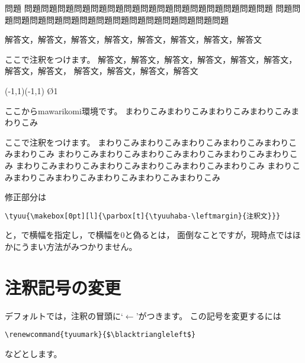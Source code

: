 \documentclass[a4j,fleqn]{jarticle}
\begin{document}
\begin{itembox}{問題}
問題問題問題問題問題問題問題問題問題問題問題問題問題問題問題
問題問題問題問題問題問題問題問題問題問題問題問題問題問題問題
\end{itembox}
\begin{tyuukai}
解答文，解答文，解答文，解答文，解答文，解答文，解答文，解答文

ここで注釈をつけます。
解答文，解答文，解答文，解答文，解答文，解答文，解答文，解答文，
解答文，解答文，解答文，解答文

\begin{mawarikomi}{}{%
  \begin{zahyou*}[ul=1cm](-1,1)(-1,1)
    \Drawline{\LT\LB\RB\RT\LT}
    \En\O1
  \end{zahyou*}}
ここから\textsf{mawarikomi}環境です。
まわりこみまわりこみまわりこみまわりこみまわりこみ

ここで注釈をつけます。
まわりこみまわりこみまわりこみまわりこみまわりこみまわりこみ
まわりこみまわりこみまわりこみまわりこみまわりこみまわりこみ
まわりこみまわりこみまわりこみまわりこみまわりこみまわりこみ
まわりこみまわりこみまわりこみまわりこみまわりこみまわりこみ
\end{mawarikomi}
\end{tyuukai}
修正部分は
\begin{jquote}
\begin{verbatim}
\tyuu{\makebox[0pt][l]{\parbox[t]{\tyuuhaba-\leftmargin}{注釈文}}}
\end{verbatim}
\end{jquote}
と，で横幅を指定し，で横幅を0と偽るとは，
面倒なことですが，現時点ではほかにうまい方法がみつかりません。

\section{注釈記号の変更}
デフォルトでは，注釈の冒頭に`$\longleftarrow$'がつきます。
この記号を変更するには
\begin{jquote}
\begin{verbatim}
\renewcommand{tyuumark}{$\blacktriangleleft$}
\end{verbatim}
\end{jquote}
などとします。
\end{document}
